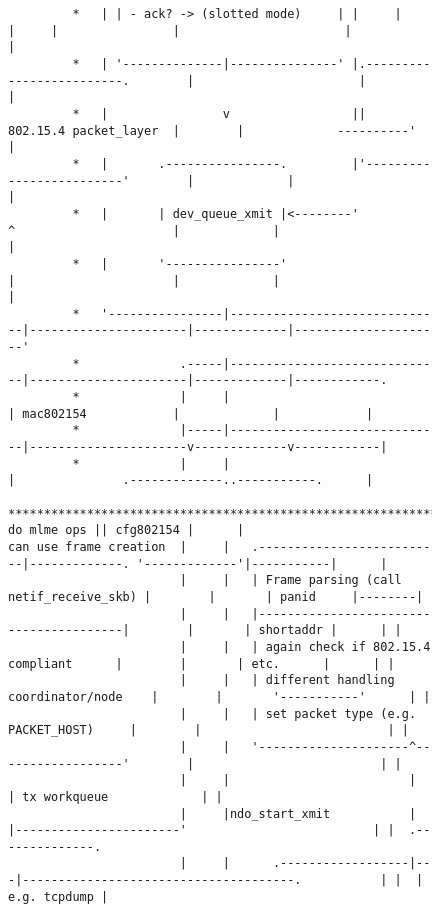 \begin{figure}
{\begin{verbatim}
         *   | | - ack? -> (slotted mode)     | |     |      |     |                |                       |           |
         *   | '--------------|---------------' |.-------------------------.        |                       |           |
         *   |                v                 ||  802.15.4 packet_layer  |        |             ----------'           |
         *   |       .----------------.         |'-------------------------'        |             |                     |
         *   |       | dev_queue_xmit |<--------'            ^                      |             |                     |
         *   |       '----------------'                      |                      |             |                     |
         *   '----------------|------------------------------|----------------------|-------------|---------------------'
         *              .-----|------------------------------|----------------------|-------------|------------.
         *              |     |                              | mac802154            |             |            |
         *              |-----|------------------------------|----------------------v-------------v------------|
         *              |     |                              |               .-------------..-----------.      |
         *******************************************************************>| do mlme ops || cfg802154 |      |
can use frame creation  |     |   .--------------------------|-------------. '-------------'|-----------|      |
                        |     |   | Frame parsing (call netif_receive_skb) |        |       | panid     |--------|
                        |     |   |----------------------------------------|        |       | shortaddr |      | |
                        |     |   | again check if 802.15.4 compliant      |        |       | etc.      |      | |
                        |     |   | different handling coordinator/node    |        |       '-----------'      | |
                        |     |   | set packet type (e.g. PACKET_HOST)     |        |                          | |
                        |     |   '---------------------^------------------'        |                          | |
                        |     |                         |                           | tx workqueue             | |
                        |     |ndo_start_xmit           |   |-----------------------'                          | |  .--------------.
                        |     |      .------------------|---|--------------------------------------.           | |  | e.g. tcpdump |

\end{verbatim}}
\end{figure}
